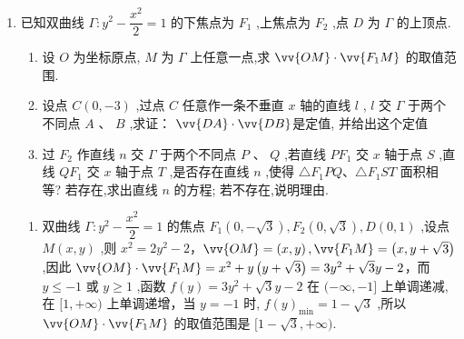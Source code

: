 \begin{enumerate}
\begin{enumerate}
\begin{jieda}
\begin{enumerate}
                $\dfrac{{S}_{\bigtriangleup {APB}}}{{S}_{\bigtriangleup {APD}}} = \dfrac{t}{\dfrac{16t-16}{3t}-t} = \dfrac{3t^2}{-3t^2+16t-16} = \dfrac{3}{-\dfrac{16}{t^2}+\dfrac{16}{t}-3} \geq 3$，$t = 2$时取等.
            \end{enumerate}
        \end{jieda}
        \item 已知双曲线 $\Gamma  : {y}^{2} - \dfrac{{x}^{2}}{2} = 1$ 的下焦点为 ${F}_{1}$ ,上焦点为 ${F}_{2}$ ,点 $D$ 为 $\Gamma$ 的上顶点.
        \begin{enumerate}
            \item 设 $O$ 为坐标原点, $M$ 为 $\Gamma$ 上任意一点,求 $\vv{OM} \cdot  \vv{{F}_{1}M}$ 的取值范围.
            \item 设点 $C\left( {0, - 3}\right)$ ,过点 $C$ 任意作一条不垂直 $x$ 轴的直线 $l$ , $l$ 交 $\Gamma$ 于两个不同点 $A$ 、 $B$ ,求证： $\vv{DA} \cdot  \vv{DB}$是定值, 并给出这个定值
            \item 过 ${F}_{2}$ 作直线 $n$ 交 $\Gamma$ 于两个不同点 $P$ 、 $Q$ ,若直线 $P{F}_{1}$ 交 $x$ 轴于点 $S$ ,直线 $Q{F}_{1}$ 交 $x$ 轴于点 $T$ ,是否存在直线 $n$ ,使得 $\triangle {F}_{1}{PQ}\text{、}\triangle {F}_{1}{ST}$ 面积相等? 若存在,求出直线 $n$ 的方程; 若不存在,说明理由.
        \end{enumerate}
        \begin{jieda}
            \begin{enumerate}
                \item 双曲线 $\Gamma  : {y}^{2} - \dfrac{{x}^{2}}{2} = 1$ 的焦点 ${F}_{1}\left( {0, - \sqrt{3}}\right) ,{F}_{2}\left( {0,\sqrt{3}}\right) ,D\left( {0,1}\right)$ ,设点 $M\left( {x,y}\right)$ ,则 ${x}^{2} = 2{y}^{2} - 2$，$\vv{OM} = \left( {x,y}\right) ,\vv{{F}_{1}M} = \left( {x,y + \sqrt{3}}\right)$ ,因此 $\vv{OM} \cdot  \vv{{F}_{1}M} = {x}^{2} + y\left( {y + \sqrt{3}}\right)  = 3{y}^{2} + \sqrt{3}y - 2$，而 $y \leq   - 1$ 或 $y \geq  1$ ,函数 $f\left( y\right)  = 3{y}^{2} + \sqrt{3}y - 2$ 在 $( - \infty , - 1\rbrack$ 上单调递减,在 $\lbrack 1, + \infty )$ 上单调递增，当 $y =  - 1$ 时, $f{\left( y\right) }_{\min } = 1 - \sqrt{3}$ ,所以 $\vv{OM} \cdot  \vv{{F}_{1}M}$ 的取值范围是 $\lbrack 1 - \sqrt{3}, + \infty )$.

\end{enumerate}
\end{jieda}
\end{enumerate}
\end{enumerate}

